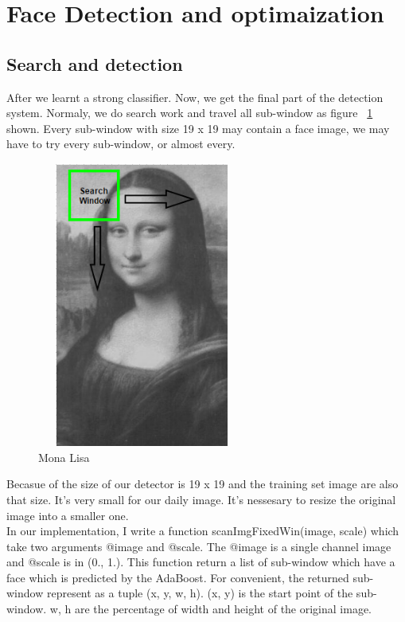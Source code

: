 \documentclass[a4paper, 11pt]{article} %
\begin{document}
\clearpage
\section{Face Detection and optimaization}
\subsection{Search and detection}

    After we learnt a strong classifier.
    Now, we get the final part of the detection system. Normaly, we do search work and travel all sub-window as figure ~\ref{fig:mona} shown. Every sub-window with size 19 x 19 may contain a face image, we may have to try every sub-window, or almost every.

    \begin{figure}[H]
        \centering
        \includegraphics[height = 3.7in, width = 2.7in ]{../figure/searchWindow.png}
        \caption{Mona Lisa}
        \label{fig:mona}
    \end{figure}

    Becasue of the size of our detector is 19 x 19 and the training set image are also that size. It's very small for our daily image. It's nessesary to resize the original image into a smaller one.\\

    In our implementation, I write a function scanImgFixedWin(image, scale) which take two arguments @image and @scale. The @image is a single channel image and @scale is in (0., 1.). This function return a list of sub-window which have a face which is predicted by the AdaBoost. For convenient, the returned sub-window represent as a tuple (x, y, w, h).
(x, y) is the start point of the sub-window.  w, h are the percentage of width and height of the original image.
\end{document}
